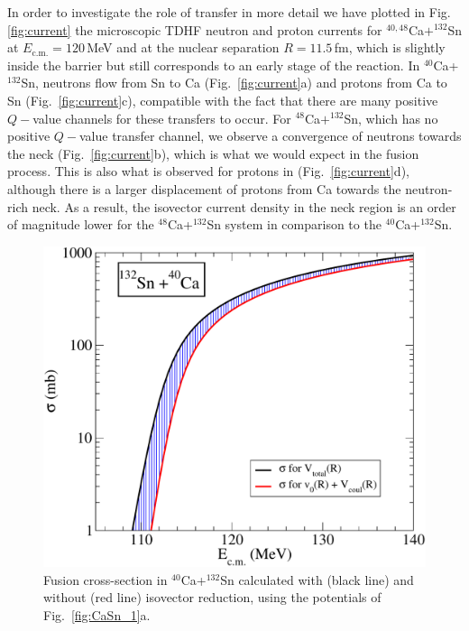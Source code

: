 In order to investigate the role of transfer in more detail we have plotted  in Fig.\,\ref{fig:current}
the microscopic TDHF neutron and proton currents for $^{40,48}$Ca$+^{132}$Sn
at  $E_\mathrm{c.m.}=120$\,MeV and  at the nuclear separation $R=11.5$\,fm,
which is slightly inside the barrier but still corresponds to an early stage of the reaction.
In $^{40}$Ca+$^{132}$Sn, neutrons flow from Sn to Ca (Fig.~\ref{fig:current}a) and protons from Ca to Sn (Fig.~\ref{fig:current}c),
compatible with the fact that there are many positive $Q-$value channels for these transfers to occur.
For $^{48}$Ca$+^{132}$Sn, which has no positive $Q-$value transfer channel,
we observe a convergence of neutrons towards the neck (Fig.~\ref{fig:current}b),
which is what we would expect in the fusion process.
This is also what is observed for protons in (Fig.~\ref{fig:current}d),
although there is a larger displacement of protons from Ca towards the
neutron-rich neck. %
As a result, the isovector current density in the neck region is an order of magnitude lower
for the $^{48}$Ca+$^{132}$Sn system in comparison to the $^{40}$Ca+$^{132}$Sn.
\begin{figure}
	\centering
	\includegraphics[width=\textwidth]{../Figures/Isospin/x_40Ca_132Sn.pdf}
	\caption{Fusion cross-section  in $^{40}$Ca+$^{132}$Sn calculated with (black line) and without (red line) isovector reduction, using the potentials of Fig.~\ref{fig:CaSn_1}a.}
	\label{fig:cs}
\end{figure}
